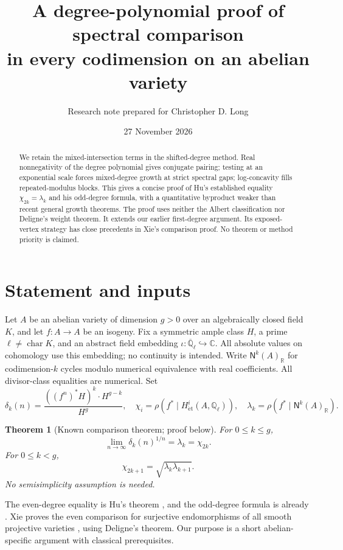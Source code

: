 \documentclass[11pt]{article}
\title{\vspace{-1.5em}A degree-polynomial proof of spectral comparison\\
in every codimension on an abelian variety}
\author{\small Research note prepared for Christopher D. Long}
\date{\small 27 November 2026}
\newtheorem{theorem}{Theorem}
\newcommand{\Q}{\mathbb Q}
\newcommand{\R}{\mathbb R}
\newcommand{\C}{\mathbb C}
\newcommand{\N}{\mathsf N}
\begin{document}
\maketitle
\vspace{-1.2em}
\begin{abstract}
We retain the mixed-intersection terms in the shifted-degree method.
Real nonnegativity of the degree polynomial gives conjugate pairing;
testing at an exponential scale forces mixed-degree growth at
strict spectral gaps; log-concavity fills repeated-modulus blocks.
This gives a concise proof of Hu's established equality
\(\chi_{2k}=\lambda_k\) and his odd-degree formula, with a quantitative
byproduct weaker than recent general growth theorems. The proof uses neither the Albert
classification nor Deligne's weight theorem. It extends our earlier
first-degree argument. Its exposed-vertex strategy has close precedents
in Xie's comparison proof. No theorem or method priority is claimed.
\end{abstract}

\section{Statement and inputs}
Let \(A\) be an abelian variety of dimension \(g>0\) over an algebraically
closed field \(K\), and let \(f:A\to A\) be an isogeny. Fix a symmetric ample
class \(H\), a prime \(\ell\ne\operatorname{char}K\), and an abstract field embedding
\(\iota:\overline{\Q}_\ell\hookrightarrow\C\). All absolute values on
cohomology use this embedding; no continuity is intended. Write
\(\N^k(A)_\R\) for codimension-\(k\) cycles modulo numerical equivalence
with real coefficients. All divisor-class equalities are numerical. Set
\[
 \delta_k(n)=\frac{((f^n)^*H)^k\cdot H^{g-k}}{H^g},\quad
 \chi_i=\rho(f^*\mid H^i_{\mathrm{\acute et}}(A,\Q_\ell)),\quad
 \lambda_k=\rho(f^*\mid\N^k(A)_\R).
 \tag{1}
\]
\begin{theorem}[Known comparison theorem; proof below]\label{main}
For \(0\le k\le g\),
\[
 \lim_{n\to\infty}\delta_k(n)^{1/n}=\lambda_k=\chi_{2k}.
 \tag{2}
\]
For \(0\le k<g\),
\[
 \chi_{2k+1}=\sqrt{\lambda_k\lambda_{k+1}}.
 \tag{3}
\]
No semisimplicity assumption is needed.
\end{theorem}
The even-degree equality is Hu's theorem \cite[Theorem 1.9]{Hu}, and
the odd-degree formula is already \cite[Remark 5.5]{Hu}.
Xie proves the even comparison for surjective endomorphisms of all smooth projective varieties
\cite{Xie}, using Deligne's theorem. Our purpose is a short abelian-specific
argument with classical prerequisites.
\end{document}
